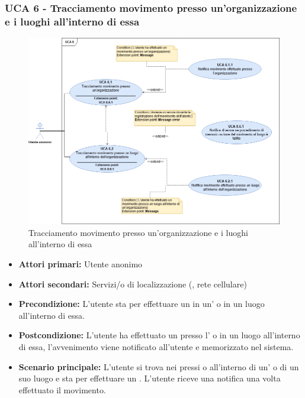 \subsubsection{UCA 6 - Tracciamento movimento presso un'organizzazione e i luoghi all'interno di essa}%

\begin{figure}[h]
	\centering
	\includegraphics[scale=0.4, center]{Sezioni/UseCase/Immagini/UCA6.png}
	\caption{Tracciamento movimento presso un’organizzazione e i luoghi all’interno di essa}
\end{figure}

\begin{itemize}
	\item \textbf{Attori primari:} Utente anonimo
	\item \textbf{Attori secondari:} Servizi/o di localizzazione (, rete cellulare)
	\item \textbf{Precondizione:} L'utente sta per effettuare un  in un' o in un luogo all'interno di essa.
	\item \textbf{Postcondizione:} L'utente ha effettuato un  presso l' o in un luogo all'interno di essa, l'avvenimento viene notificato all'utente e memorizzato nel sistema. 
	\item \textbf{Scenario principale:} L'utente si trova nei pressi o all'interno di un' o di un suo luogo e sta per effettuare un . L'utente riceve una notifica una volta effettuato il movimento. %
\end{itemize}

